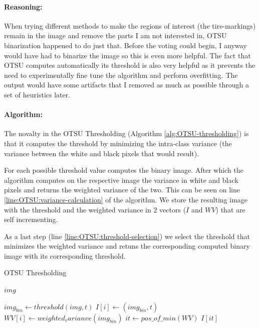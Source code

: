 \paragraph*{Reasoning:}\mbox{}\par
When trying different methods to make the regions of interest (the tire-markings) remain in the image and remove the parts I am not interested in, OTSU binarization happened to do just that. Before the voting could begin, I anyway would have had to binarize the image so this is even more helpful. The fact that OTSU computes automatically its threshold is also very helpful as it prevents the need to experimentally fine tune the algorithm and perform overfitting. The output would have some artifacts that I removed as much as possible through a set of heuristics later.

\paragraph*{Algorithm:}\mbox{}\par
The novalty in the OTSU Thresholding (Algorithm \ref{alg:OTSU-thresholding}) is that it computes the threshold by minimizing the intra-class variance (the variance between the white and black pixels that would result).

For each possible threshold value computes the binary image. After which the algorithm computes on the respective image the variance in white and black pixels and returns the weighted variance of the two. This can be seen on line \ref{line:OTSU:variance-calculation} of the algorithm. We store the resulting image with the threshold and the weighted variance in 2 vectors ($I$ and $WV$) that are self incrementing.

As a last step (line \ref{line:OTSU:threshold-selection}) we select the threshold that minimizes the weighted variance and retuns the corresponding computed binary image with its corresponding threshold.

\begin{algorithm}
    \caption{OTSU Thresholding}\label{alg:OTSU-thresholding}
    \begin{algorithmic}[1]
        \Require $img$

            \State $img_{bin} \gets threshold(img, t)$
            \State $I[i] \gets (img_{bin}, t)$
            \State $WV[i] \gets weighted_varianve(img_{bin})$\label{line:OTSU:variance-calculation}
        \EndFor
        \State $it \gets pos\_of\_min(WV)$\label{line:OTSU:threshold-selection}
        \State \Return $I[it]$
    \end{algorithmic}
\end{algorithm}

